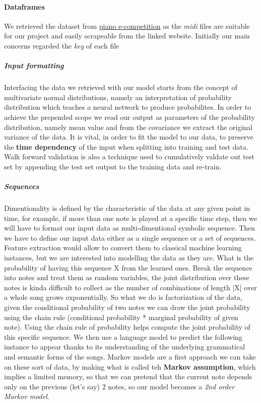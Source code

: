 \documentclass[12pt]{article}
\begin{document}
  \paragraph{\Huge Dataframes}
  We retrieved the dataset from \href{http://www.piano-e-competition.com/}{piano e-competition} as the \textit{midi} files are suitable for our project and easily scrapeable from the linked website. Initially our main concerns regarded the \textit{key} of each file
  \subparagraph{\Large Input formatting}
    Interfacing the data we retrieved with our model starts from the concept of multivariate normal distributions, namely an interpretation of probability distribution which teaches a neural network to produce probabilites. In order to achieve the prepended scope we read our output as parameters of the probability distribution, namely mean value and from the covariance we extract the original variance of the data. It is vital, in order to fit the model to our data, to preserve the \textbf{time dependency} of the input when splitting into training and test data. Walk forward validation is also a technique used to cumulatively valdate out test set by appending the test set output to the training data and re-train.
  \subparagraph{\Large Sequences}
    Dimentionality is defined by the characteristic of the data at any given point in time, for example, if more than one note is played at a specific time step, then we will have to format our input data as multi-dimentional symbolic sequence. Then we have to define our input data either as a single sequence or a set of sequences. Feature extraction would allow to convert them to classical machine learning instances, but we are interested into modelling the data as they are.
    What is the probability of having this sequence X from the learned ones. Break the sequence into notes and treat them as random variables, the joint distribution over these notes is kinda difficult to collect as the number of combinations of length |X| over a whole song grows exponentially. So what we do is factorization of the data, given the conditional probability of two notes we can draw the joint probability using the chain rule (conditional probability * marginal probability of given note). Using the chain rule of probability helps compute the joint probability of this specific sequence. We then use a language model to predict the following instance to appear thanks to its understanding of the underlying grammatical and semantic forms of the songs. Markov models are a first approach we can take on these sort of data, by making what is called teh \textbf{Markov assumption}, which implies a limited memory, so that we can pretend that the current note depends only on the previous (let's say) 2 notes, so our model becomes a \textit{2nd order Markov model}.
\end{document}
